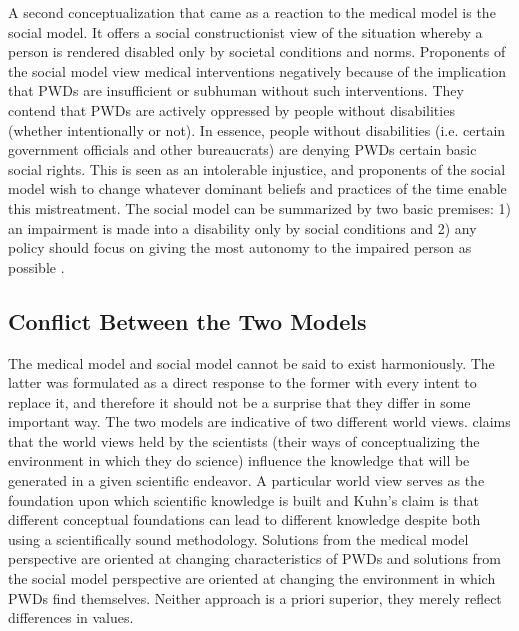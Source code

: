 \documentclass[a4paper]{article}
\begin{document}
A second conceptualization that came as a reaction to the medical model is the
social model. It offers a social constructionist view of the situation whereby
a person is rendered disabled only by societal conditions and norms.
Proponents of the social model view medical interventions negatively because
of the implication that PWDs are insufficient or subhuman without such
interventions. They contend that PWDs are actively oppressed by people without
disabilities (whether intentionally or not). In essence, people without
disabilities (i.e. certain government officials and other bureaucrats) are
denying PWDs certain basic social rights. This is seen as an intolerable
injustice, and proponents of the social model wish to change whatever dominant
beliefs and practices of the time enable this mistreatment. The social model
can be summarized by two basic premises: 1) an impairment is made into a
disability only by social conditions and 2) any policy should focus on giving
the most autonomy to the impaired person as possible
\citep{winter2003development}.


\subsection{Conflict Between the Two Models}

The medical model and social model cannot be said to exist harmoniously. The
latter was formulated as a direct response to the former with every intent to
replace it, and therefore it should not be a surprise that they differ in some
important way. The two models are indicative of two different world views.
\cite{kuhn1970structure} claims that the world views held by the scientists
(their ways of conceptualizing the environment in which they do science)
influence the knowledge that will be generated in a given scientific endeavor.
A particular world view serves as the foundation upon which scientific
knowledge is built and Kuhn's claim is that different conceptual foundations
can lead to different knowledge despite both using a scientifically sound
methodology. Solutions from the medical model perspective are oriented at
changing characteristics of PWDs and solutions from the social model
perspective are oriented at changing the environment in which PWDs find
themselves. Neither approach is a priori superior, they merely reflect
differences in values.
\end{document}

